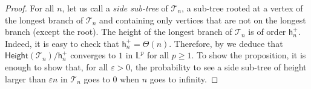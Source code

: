 \documentclass[11pt]{article}
\theoremstyle{plain}
\theoremstyle{definition}
\theoremstyle{remark}
\newcommand{\Lp}{\mathbb{L}} %
\newcommand{\1}{\mathbbm{1}} %
\newcommand{\e}{\varepsilon} %
\newcommand{\T}{\mathcal{T}} %
\newcommand{\Height}{\mathsf{Height}} %
\newcommand{\h}{\mathsf{h}} %
\newcommand{\Xb}{\mathrm{\mathbf{x}}} %
\begin{document}
\begin{proof}
For all $n$, let us call a \emph{side sub-tree} of $\T_n$, a sub-tree rooted at a vertex of the longest branch of $\T_n$ and containing only vertices that are not on the longest branch (except the root). The height of the longest branch of $\T_n$ is of order $\h_n^+$. Indeed, it is easy to check that $\h_n^+ = \Theta(n)$. Therefore, by \cite[Theorem 3 (3)]{BBKK23+} we deduce that $\Height(\T_n)/\h_n^+$ converges to $1$ in $\Lp^p$ for all $p\geq 1$. To show the proposition, it is enough to show that, for all $\e>0$, the probability to see a side sub-tree of height larger than $\e n$ in $\T_n$ goes to $0$ when $n$ goes to infinity. 




\end{proof}
\end{document}

